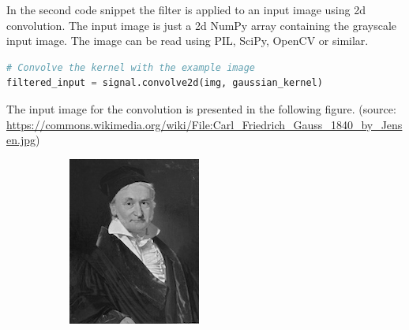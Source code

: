 \documentclass[]{article}
\begin{document}
In the second code snippet the filter is applied to an input image using 2d
convolution. The input image is just a 2d NumPy array containing the grayscale
input image. The image can be read using PIL, SciPy, OpenCV or similar.
\begin{lstlisting}[language=Python]
# Convolve the kernel with the example image
filtered_input = signal.convolve2d(img, gaussian_kernel)
\end{lstlisting}
The input image for the convolution is presented in the following figure. (source: \url{https://commons.wikimedia.org/wiki/File:Carl_Friedrich_Gauss_1840_by_Jensen.jpg})
\begin{figure}
  \label{fig:gaussian-input-output}
  \centering
    \begin{subfigure}[t]{0.49\textwidth}
      \centering
      \includegraphics[width=0.99\linewidth]{input.png}
    \end{subfigure}
    \begin{subfigure}[t]{0.49\textwidth}
      \centering

\end{subfigure}
\end{figure}
\end{document}
